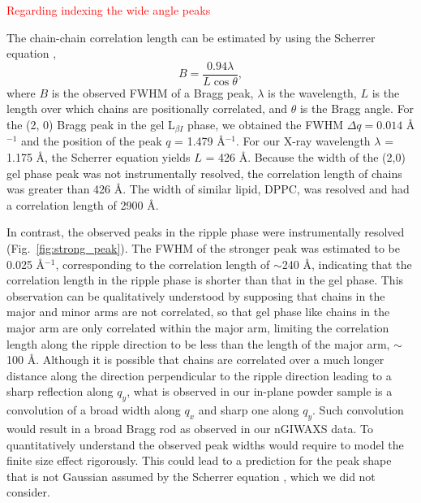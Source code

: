 \textcolor{red}{Regarding indexing the wide angle peaks}

The chain-chain correlation length can be estimated by using the Scherrer equation 
\cite{ref:Warren69},
\[
  B = \frac{0.94\lambda}{L\cos\theta},
\]
where $B$ is the observed FWHM of a Bragg peak, $\lambda$ is the wavelength,
$L$ is the length over which chains are positionally correlated, 
and $\theta$ is the Bragg angle. For the (2, 0) Bragg peak in
the gel L$_{\beta I}$ phase, we obtained the FWHM $\Delta q = 0.014$ \AA$^{-1}$ and
the position of the peak $q$ = 1.479 \AA$^{-1}$. For our X-ray wavelength
$\lambda$ = 1.175 \AA, the Scherrer equation yields $L$ = 426 \AA. 
Because the width of the (2,0) gel phase peak 
was not instrumentally resolved, the correlation length of chains was 
greater than 426 \AA.
The width of similar lipid, DPPC, was resolved and had a correlation 
length of 2900 \AA \cite{ref:Sun94}.

In contrast, the observed peaks in the ripple phase were instrumentally 
resolved (Fig.~\ref{fig:strong_peak}). 
The FWHM of the stronger peak was estimated to be 0.025 \AA$^{-1}$,
corresponding to the correlation length of $\sim$240 \AA,
indicating that the correlation length in the ripple phase is shorter 
than that in the gel phase.
This observation can be qualitatively understood by supposing that chains in the major
and minor arms are not correlated, so that gel phase like chains in the 
major arm are only correlated within the major arm, limiting the correlation
length along the ripple direction to be less than the length of the major 
arm, $\sim$100 \AA. Although
it is possible that chains are correlated over a much longer distance 
along the direction perpendicular to the ripple direction leading to
a sharp reflection along $q_y$,
what is observed in our in-plane powder sample is a convolution
of a broad width along $q_x$ and sharp one along $q_y$. Such convolution
would result in a broad Bragg rod as observed in our nGIWAXS data.
To quantitatively understand the observed peak widths would require to
model the finite size effect rigorously. This could lead to a prediction
for the peak shape that is not Gaussian assumed by the Scherrer equation 
\cite{ref:Warren69}, which we did not consider.

